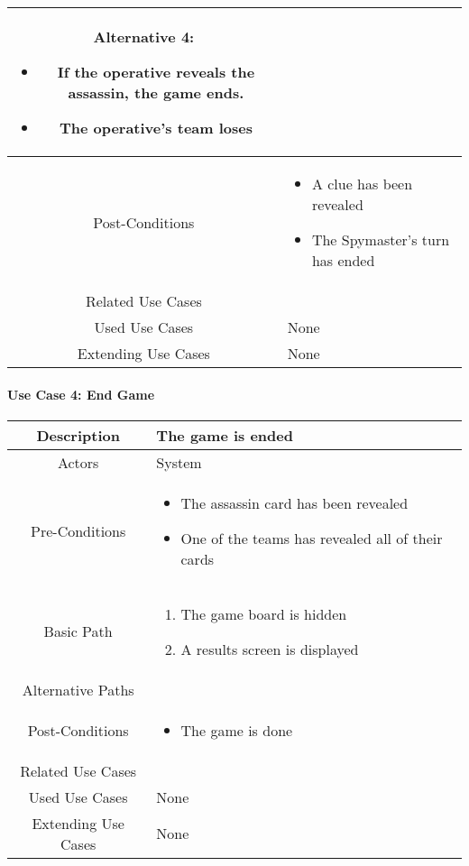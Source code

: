 \documentclass[10pt, a4paper]{article}
\begin{document}
\begin{center}
\begin{tabular}{ |c|p{7cm}| }
		Alternative 4:
		\begin{itemize}
			\item If the operative reveals the assassin, the game ends.
			\item The operative’s team loses  
		\end{itemize}
				\\
				\hline 
				Post-Conditions & 
				\begin{itemize}
					\item A clue has been revealed
					\item The Spymaster’s turn has ended 
				\end{itemize} \\
				\hline 
				Related Use Cases & \\
				\hline 
				Used Use Cases & None \\
				\hline
				Extending Use Cases & None \\
				\hline
			\end{tabular}
		\end{center}
			
			\paragraph{Use Case 4: End Game}
			\begin{center}
				\begin{tabular}{ |c|p{7cm}| } 
					\hline
					Description & The game is ended \\ 
					\hline
					Actors & System  \\
					\hline 
					Pre-Conditions & \begin{itemize}	
						\item The assassin card has been revealed 
						\item One of the teams has revealed all of their cards
					\end{itemize}	
					\\
					\hline
					Basic Path & 
					\begin{enumerate}
						\item The game board is hidden
						\item A results screen is displayed   
					\end{enumerate} \\
					\hline 
					Alternative Paths & 
					\\
					\hline 
					Post-Conditions & 
					\begin{itemize}
						\item The game is done
						
					\end{itemize} \\
					\hline 
					Related Use Cases & \\
					\hline 
					Used Use Cases & None \\
					\hline
					Extending Use Cases & None \\
					\hline
				\end{tabular}
			\end{center}
	
\end{document}
